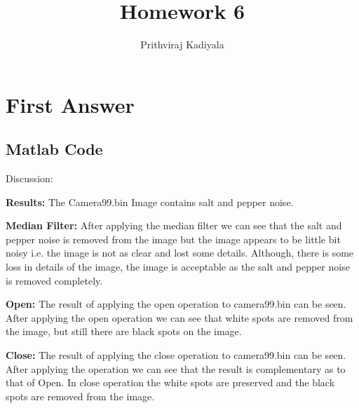 \documentclass[11pt]{article} %
\title{Homework 6}
\author{Prithviraj Kadiyala}
\begin{document}
\maketitle

\section{First Answer}

\subsection*{Matlab Code}


Discussion:\break
\break
\begin{flushleft}
\textbf{Results:} The Camera99.bin Image contains salt and pepper noise. \break


\textbf{Median Filter:} After applying the median filter we can see that the salt and pepper noise is
removed from the image but the image appears to be little bit noisy i.e. the image is not as clear
and lost some details. Although, there is some loss in details of the image, the image is
acceptable as the salt and pepper noise is removed completely.\break


\textbf{Open:} The result of applying the open operation to camera99.bin can be seen. After applying the
open operation we can see that white spots are removed from the image, but
still there are black spots on the image. \break


\textbf{Close:} The result of applying the close operation to camera99.bin can be seen. After applying the
operation we can see that the result is complementary as to that of Open. In close operation the
white spots are preserved and the black spots are removed from the image.

\end{flushleft}
\end{document}
